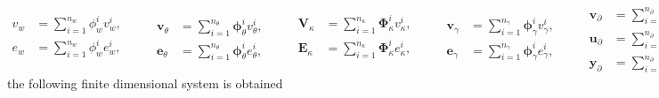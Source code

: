 \begin{equation}\label{eq:approx_vebMin}
\begin{aligned}
v_w &= \sum_{i = 1}^{n_w} \phi_w^i v_w^i, \\
e_w &= \sum_{i = 1}^{n_w} \phi_w^i e_w^i, \\
\end{aligned} \qquad
\begin{aligned}
\bm{v}_\theta &= \sum_{i = 1}^{n_\theta} \bm\phi_\theta^i v_\theta^i, \\
\bm{e}_\theta &= \sum_{i = 1}^{n_\theta} \bm\phi_\theta^i e_\theta^i,
\end{aligned} \qquad
\begin{aligned}
\bm{V}_\kappa &= \sum_{i = 1}^{n_\kappa} \bm\Phi_\kappa^i v_\kappa^i, \\
\bm{E}_\kappa &= \sum_{i = 1}^{n_\kappa} \bm\Phi_\kappa^i e_\kappa^i, \\
\end{aligned} \qquad
\begin{aligned}
\bm{v}_\gamma &= \sum_{i = 1}^{n_\gamma} \bm\phi_\gamma^i v_\gamma^i, \\
\bm{e}_\gamma &= \sum_{i = 1}^{n_\gamma} \bm\phi_\gamma^i e_\gamma^i,
\end{aligned} \qquad
\begin{aligned}
\bm{v}_\partial &= \sum_{i = 1}^{n_\partial} \bm\phi_\partial^i v_\partial^i, \\
\bm{u}_\partial &= \sum_{i = 1}^{n_\partial} \bm\phi_\partial^i u_\partial^i, \\
\bm{y}_\partial &= \sum_{i = 1}^{n_\partial} \bm\phi_\partial^i y_\partial^i.
\end{aligned}
\end{equation} 
the following finite dimensional system is obtained
